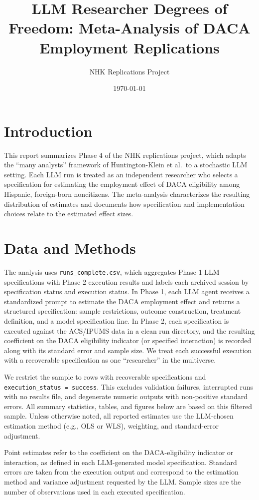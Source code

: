 \documentclass[11pt]{article}
\title{LLM Researcher Degrees of Freedom: Meta-Analysis of DACA Employment Replications}
\author{NHK Replications Project}
\date{\today}
\begin{document}
\maketitle

\section{Introduction}
This report summarizes Phase 4 of the NHK replications project, which adapts the ``many analysts'' framework of Huntington-Klein et al.\ to a stochastic LLM setting. Each LLM run is treated as an independent researcher who selects a specification for estimating the employment effect of DACA eligibility among Hispanic, foreign-born noncitizens. The meta-analysis characterizes the resulting distribution of estimates and documents how specification and implementation choices relate to the estimated effect sizes.

\section{Data and Methods}
The analysis uses \texttt{runs\_complete.csv}, which aggregates Phase 1 LLM specifications with Phase 2 execution results and labels each archived session by specification status and execution status. In Phase 1, each LLM agent receives a standardized prompt to estimate the DACA employment effect and returns a structured specification: sample restrictions, outcome construction, treatment definition, and a model specification line. In Phase 2, each specification is executed against the ACS/IPUMS data in a clean run directory, and the resulting coefficient on the DACA eligibility indicator (or specified interaction) is recorded along with its standard error and sample size. We treat each successful execution with a recoverable specification as one ``researcher'' in the multiverse.

We restrict the sample to rows with recoverable specifications and \texttt{execution\_status = success}. This excludes validation failures, interrupted runs with no results file, and degenerate numeric outputs with non-positive standard errors. All summary statistics, tables, and figures below are based on this filtered sample. Unless otherwise noted, all reported estimates use the LLM-chosen estimation method (e.g., OLS or WLS), weighting, and standard-error adjustment.

Point estimates refer to the coefficient on the DACA-eligibility indicator or interaction, as defined in each LLM-generated model specification. Standard errors are taken from the execution output and correspond to the estimation method and variance adjustment requested by the LLM. Sample sizes are the number of observations used in each executed specification.
\end{document}
